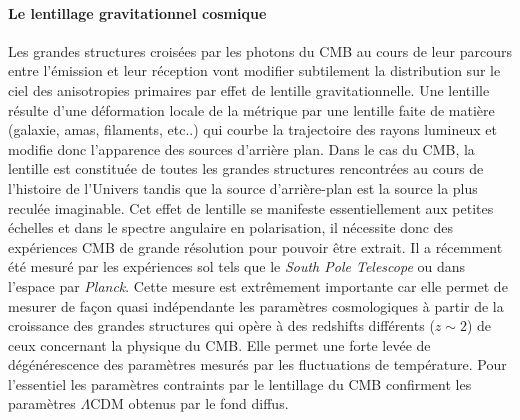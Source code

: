 \paragraph{Le lentillage gravitationnel cosmique}
Les grandes structures croisées par les photons du CMB au cours de leur parcours entre l'émission et leur réception vont modifier subtilement la distribution sur le ciel des anisotropies primaires par effet de lentille gravitationnelle. Une lentille résulte d'une déformation locale de la métrique par une lentille faite de matière (galaxie, amas, filaments, etc..) qui courbe la trajectoire des rayons lumineux et modifie donc l'apparence des sources d'arrière plan. Dans le cas du CMB, la lentille est constituée de toutes les grandes structures rencontrées au cours de l'histoire de l'Univers tandis que la source d'arrière-plan est la source la plus reculée imaginable. Cet effet de lentille se manifeste essentiellement aux petites échelles et dans le spectre angulaire en polarisation, il nécessite donc des expériences CMB de grande résolution pour pouvoir être extrait. Il a récemment été mesuré par les expériences sol tels que le \textit{South Pole Telescope} ou dans l'espace par \textit{Planck}. Cette mesure est extrêmement importante car elle permet de mesurer de façon quasi indépendante les paramètres cosmologiques à partir de la croissance des grandes structures qui opère à des redshifts différents ($z\sim 2$) de ceux concernant la physique du CMB. Elle permet une forte levée de dégénérescence des paramètres mesurés par les fluctuations de température. Pour l'essentiel les paramètres contraints par le lentillage du CMB confirment les paramètres $\Lambda$CDM obtenus par le fond diffus.